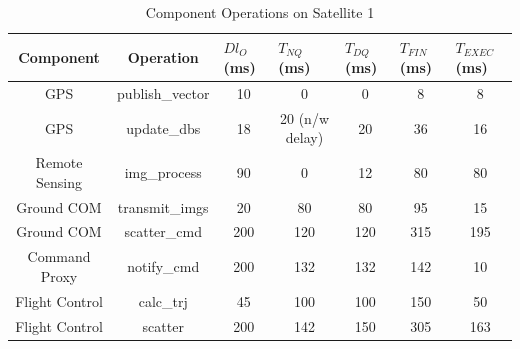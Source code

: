 \begin{table}[h]
	\caption{Component Operations on Satellite 1}
	\label{table:AR}
	\begin{center}
		\begin{tabular}{ | c | p{1.0cm} | p{1.0cm} | p{1.0cm} | p{1.0cm} | p{1.0cm} | p{1.0cm} |}
			\hline
			Component & \multicolumn{1}{|c|}{Operation} & $Dl_{O}$ (ms) & $T_{NQ}$ (ms) & $T_{DQ}$ (ms) & $T_{FIN}$ (ms) & $T_{EXEC}$ (ms) \\ \hline
			GPS & \multicolumn{1}{|c|}{publish\_vector} & \multicolumn{1}{|c|}{10} & \multicolumn{1}{|c|}{0} & \multicolumn{1}{|c|}{0} & \multicolumn{1}{|c|}{8} & \multicolumn{1}{|c|}{8} \\ \hline
			GPS & \multicolumn{1}{|c|}{update\_dbs} & \multicolumn{1}{|c|}{18} & \multicolumn{1}{|c|}{20 (n/w delay)} & \multicolumn{1}{|c|}{20} & \multicolumn{1}{|c|}{36} & \multicolumn{1}{|c|}{16} \\ \hline
			Remote Sensing & \multicolumn{1}{|c|}{img\_process} & \multicolumn{1}{|c|}{90} & \multicolumn{1}{|c|}{0} & \multicolumn{1}{|c|}{12} & \multicolumn{1}{|c|}{80} & \multicolumn{1}{|c|}{80} \\ \hline
			Ground COM & \multicolumn{1}{|c|}{transmit\_imgs} & \multicolumn{1}{|c|}{20} & \multicolumn{1}{|c|}{80} & \multicolumn{1}{|c|}{80} & \multicolumn{1}{|c|}{95} & \multicolumn{1}{|c|}{15} \\ \hline
			Ground COM & \multicolumn{1}{|c|}{scatter\_cmd} & \multicolumn{1}{|c|}{200} & \multicolumn{1}{|c|}{120} & \multicolumn{1}{|c|}{120} & \multicolumn{1}{|c|}{315} & \multicolumn{1}{|c|}{195} \\ \hline
			Command Proxy & \multicolumn{1}{|c|}{notify\_cmd} & \multicolumn{1}{|c|}{200} & \multicolumn{1}{|c|}{132} & \multicolumn{1}{|c|}{132} & \multicolumn{1}{|c|}{142} & \multicolumn{1}{|c|}{10} \\ \hline
			Flight Control & \multicolumn{1}{|c|}{calc\_trj} & \multicolumn{1}{|c|}{45} & \multicolumn{1}{|c|}{100} & \multicolumn{1}{|c|}{100} & \multicolumn{1}{|c|}{150} & \multicolumn{1}{|c|}{50} \\ \hline
			Flight Control & \multicolumn{1}{|c|}{scatter} & \multicolumn{1}{|c|}{200} & \multicolumn{1}{|c|}{142} & \multicolumn{1}{|c|}{150} & \multicolumn{1}{|c|}{305} & \multicolumn{1}{|c|}{163} \\ \hline
			
			
		\end{tabular}
	\end{center}
\end{table}

